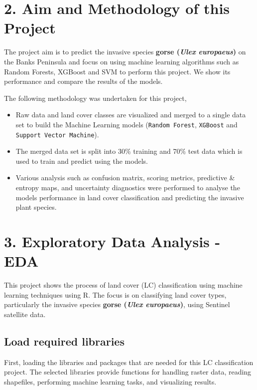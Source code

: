 \documentclass[
]{article}
\begin{document}
\section{\texorpdfstring{2. Aim and \textbf{Methodology} of this
Project}{2. Aim and Methodology of this Project}}\label{aim-of-this-project}

The project aim is to predict the invasive species \textbf{gorse
(\emph{Ulex europaeus})} on the Banks Peninsula and focus on using
machine learning algorithms such as Random Forests, XGBoost and SVM to
perform this project. We show its performance and compare the results of
the models.

The following methodology was undertaken for this project,

\begin{itemize}
\item
  Raw data and land cover classes are visualized and merged to a single
  data set to build the Machine Learning models
  (\texttt{Random\ Forest}, \texttt{XGBoost} and
  \texttt{Support\ Vector\ Machine}).
\item
  The merged data set is split into 30\% training and 70\% test data
  which is used to train and predict using the models.
\item
  Various analysis such as confusion matrix, scoring metrics, predictive
  \& entropy maps, and uncertainty diagnostics were performed to analyse
  the models performance in land cover classification and predicting the
  invasive plant species.
\end{itemize}

\section{3. Exploratory Data Analysis -
EDA}\label{exploratory-data-analysis---eda}

This project shows the process of land cover (LC) classification using
machine learning techniques using R. The focus is on classifying land
cover types, particularly the invasive species \textbf{gorse (\emph{Ulex
europaeus})}, using Sentinel satellite data.

\subsection{Load required libraries}\label{load-required-libraries}

First, loading the libraries and packages that are needed for this LC
classification project. The selected libraries provide functions for
handling raster data, reading shapefiles, performing machine learning
tasks, and visualizing results.
\end{document}
